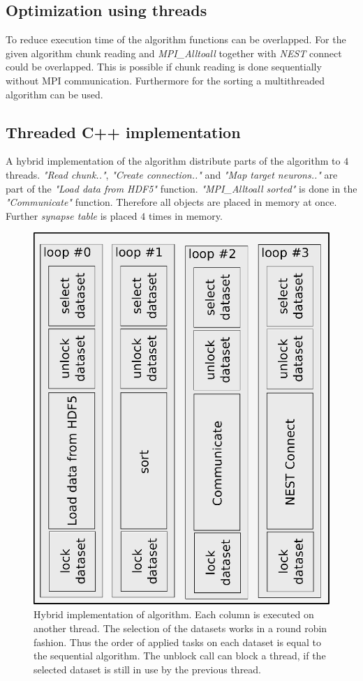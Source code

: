 \documentclass[a4paper]{article}
\begin{document}
\subsection{Optimization using threads}
To reduce execution time of the algorithm functions can be overlapped.
For the given algorithm chunk reading and \emph{MPI\_Alltoall} together with \emph{NEST} connect could be overlapped.
This is possible if chunk reading is done sequentially without MPI communication.
Furthermore for the sorting a multithreaded algorithm can be used.

\subsection{Threaded C++ implementation}
A hybrid implementation of the algorithm distribute parts of the algorithm to $4$ threads.
\emph{"Read chunk.."}, \emph{"Create connection.."} and \emph{"Map target neurons.."} are part of the \emph{"Load data from HDF5"} function.
\emph{"MPI\_Alltoall sorted"} is done in the \emph{"Communicate"} function.
Therefore all objects are placed in memory at once.
Further \emph{synapse table} is placed $4$ times in memory.

\begin{figure}[h]
\centering
\includegraphics[scale=0.5]{alg_hybrid.eps}
	\caption{Hybrid implementation of algorithm. Each column is executed on another thread. 
	The selection of the datasets works in a round robin fashion.
	Thus the order of applied tasks on each dataset is equal to the sequential algorithm.
	The unblock call can block a thread, if the selected dataset is still in use by the previous thread.}
	\label{Mikesformatcon}
\end{figure}
\end{document}
